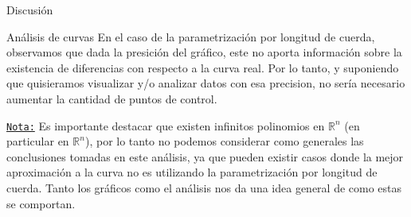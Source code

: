 \begin{section}{Discusión}
\begin{subsection}{Análisis de curvas}
	En el caso de la parametrización por longitud de cuerda, observamos que dada la presición del gráfico, este no aporta información sobre la existencia de diferencias con respecto a la curva real. Por lo tanto, y suponiendo que quisieramos visualizar y/o analizar datos con esa precision, no sería necesario aumentar la cantidad de puntos de control.
	
	\underline{\texttt{Nota:}} Es importante destacar que existen infinitos polinomios en $\mathbb{R}^n$ (en particular en $\mathbb{R}^n$), por lo tanto no podemos considerar como generales las conclusiones tomadas en este análisis, ya que pueden existir casos donde la mejor aproximación a la curva no es utilizando la parametrización por longitud de cuerda. Tanto los gráficos como el análisis nos da una idea general de como estas se comportan.
\end{subsection}


	
\end{section}
